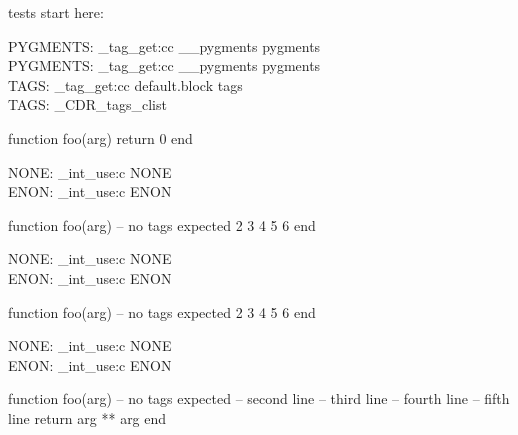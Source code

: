 \ExplSyntaxOff
\makeatother

\bgroup

tests start here:


\ExplSyntaxOn
PYGMENTS: \CDR_tag_get:cc { __pygments } { pygments } \\
\ExplSyntaxOff
{}
\ExplSyntaxOn
PYGMENTS: \CDR_tag_get:cc { __pygments } { pygments } \\
TAGS: \CDR_tag_get:cc { default.block } { tags } \\
TAGS: \g_CDR_tags_clist \\
\ExplSyntaxOff
\begin{CDRBlock}[
  stepnumber=1,
]
function foo(arg) return 0 end
\end{CDRBlock}
\ExplSyntaxOn
NONE: \CDR_int_use:c { NONE } \\
ENON: \CDR_int_use:c { ENON } \\
\ExplSyntaxOff

\begin{CDRBlock}[
  stepnumber=1,
  firstnumber = last,
]
function foo(arg) -- no tags expected
  2
  3
  4
  5
  6
end
\end{CDRBlock}

\ExplSyntaxOn
NONE: \CDR_int_use:c { NONE } \\
ENON: \CDR_int_use:c { ENON } \\
\ExplSyntaxOff

\begin{CDRBlock}[
  stepnumber=1,
  firstnumber = auto,
]
function foo(arg) -- no tags expected
  2
  3
  4
  5
  6
end
\end{CDRBlock}
\ExplSyntaxOn
NONE: \CDR_int_use:c { NONE } \\
ENON: \CDR_int_use:c { ENON } \\
\ExplSyntaxOff

\begin{CDRBlock}[
  pygments,
  lang=lua,
  numbers=none,
  debug,
  show tags=none,
  only top=false,
]
function foo(arg) -- no tags expected
  -- second line
  -- third line
  -- fourth line
  -- fifth line
  return arg ** arg
end
\end{CDRBlock}


